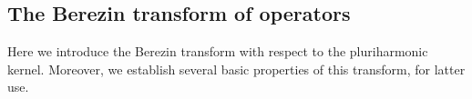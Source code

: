 \documentclass[10pt,leqno]{amsart}
\theoremstyle{remark}
\numberwithin{equation}{section}
\begin{document}
\subsection{The Berezin transform of operators}
Here we introduce the Berezin transform with respect to the pluriharmonic kernel. Moreover, we establish several basic properties of this transform, for latter use.
\end{document}
